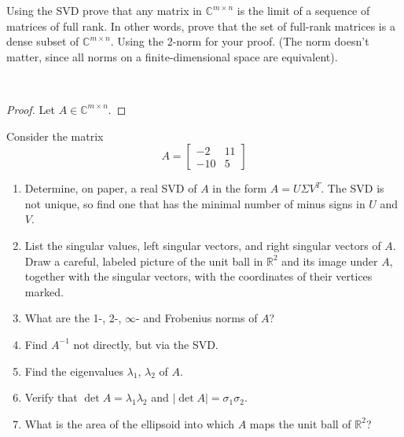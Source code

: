 \documentclass[12pt]{article}
\newenvironment{ex}[2][Exercise]{\begin{trivlist}
		\item[\hskip \labelsep {\bfseries #1}\hskip \labelsep {\bfseries #2.}]}{\end{trivlist}}
\newenvironment{sol}[1][Solution]{\begin{trivlist}
		\item[\hskip \labelsep {\bfseries #1:}]}{\end{trivlist}}
\begin{document}
\begin{ex}{5.2}
	Using the SVD prove that any matrix in $\mathbb{C}^{m\times n}$ is the limit of a sequence of matrices of
	full rank. In other words, prove that the set of full-rank matrices is a dense subset of $\mathbb{C}^{m\times n}$.
	Using the 2-norm for your proof. (The norm doesn't matter, since all norms on a finite-dimensional
	space are equivalent).
\end{ex}

\begin{sol}
	\
	\begin{proof}
		Let $A\in\mathbb{C}^{m\times n}$. 
	\end{proof}
\end{sol}

\begin{ex}{5.3}
	Consider the matrix
	\[
	A=\begin{bmatrix}
		-2 & 11\\
		-10 & 5
	\end{bmatrix}
	\]
	\begin{enumerate}
		\item Determine, on paper, a real SVD of $A$ in the form $A=U\Sigma V^T$. The SVD is not unique, so
		find one that has the minimal number of minus signs in $U$ and $V$.
		\item List the singular values, left singular vectors, and right singular vectors of $A$. Draw a
		careful, labeled picture of the unit ball in $\mathbb{R}^2$ and its image under $A$, together with
		the singular vectors, with the coordinates of their vertices marked.
		\item What are the 1-, 2-, $\infty$- and Frobenius norms of $A$?
		\item Find $A^{-1}$ not directly, but via the SVD.
		\item Find the eigenvalues $\lambda_1$, $\lambda_2$ of $A$.
		\item Verify that $\det A=\lambda_1\lambda_2$ and $|\det A|=\sigma_1\sigma_2$.
		\item What is the area of the ellipsoid into which $A$ maps the unit ball of $\mathbb{R}^2$?
	\end{enumerate}
\end{ex}
\end{document}
